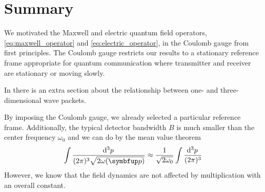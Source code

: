 \section*{Summary}

We motivated the Maxwell and electric quantum field operators, \cref{eq:maxwell_operator} and \cref{eq:electric_operator}, in the Coulomb gauge from first principles.
The Coulomb gauge restricts our results to a stationary reference frame appropriate for quantum communication where transmitter and receiver are stationary or moving slowly.



In \cite[p.~53]{Cohen2019} there is an extra section about the relationship between one- and three-dimensional wave packets.

By imposing the Coulomb gauge, we already selected a particular reference frame.
Additionally, the typical detector bandwidth $B$ is much smaller than the center frequency $\omega_0$ and we can do by the mean value theorem
\begin{equation}
	\int
	\frac{\dd[3]{p}}{(2\pi)^3\sqrt{2\omega(\vb{p})}}
	\approx
	\frac{1}{\sqrt{2\omega_0}}
	\int
	\frac{\dd[3]{p}}{(2\pi)^3}
\end{equation}
However, we know that the field dynamics are not affected by multiplication with an overall constant.